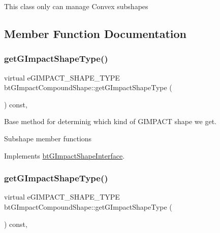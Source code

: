 This class only can manage Convex subshapes 

\subsection{Member Function Documentation}
\mbox{\label{classbtGImpactCompoundShape_a6f75f32671f5555df85d4efd342c1c67}} 
\subsubsection{\texorpdfstring{get\+G\+Impact\+Shape\+Type()}{getGImpactShapeType()}\hspace{0.1cm}{\footnotesize\ttfamily [1/2]}}
{\footnotesize\ttfamily virtual e\+G\+I\+M\+P\+A\+C\+T\+\_\+\+S\+H\+A\+P\+E\+\_\+\+T\+Y\+PE bt\+G\+Impact\+Compound\+Shape\+::get\+G\+Impact\+Shape\+Type (\begin{DoxyParamCaption}{ }\end{DoxyParamCaption}) const\hspace{0.3cm}{\ttfamily [inline]}, {\ttfamily [virtual]}}



Base method for determinig which kind of G\+I\+M\+P\+A\+CT shape we get. 

Subshape member functions 

Implements \hyperlink{classbtGImpactShapeInterface_a25cacbe448997e3f8ec99cb2d4952859}{bt\+G\+Impact\+Shape\+Interface}.

\mbox{\label{classbtGImpactCompoundShape_a6f75f32671f5555df85d4efd342c1c67}} 
\subsubsection{\texorpdfstring{get\+G\+Impact\+Shape\+Type()}{getGImpactShapeType()}\hspace{0.1cm}{\footnotesize\ttfamily [2/2]}}
{\footnotesize\ttfamily virtual e\+G\+I\+M\+P\+A\+C\+T\+\_\+\+S\+H\+A\+P\+E\+\_\+\+T\+Y\+PE bt\+G\+Impact\+Compound\+Shape\+::get\+G\+Impact\+Shape\+Type (\begin{DoxyParamCaption}{ }\end{DoxyParamCaption}) const\hspace{0.3cm}{\ttfamily [inline]}, {\ttfamily [virtual]}}



